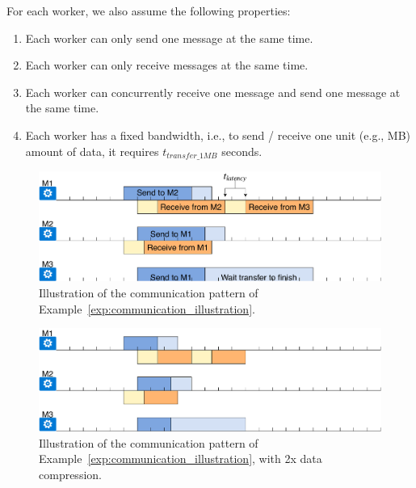 For each worker, we also assume the following properties:
\begin{enumerate}
\item Each worker can only send one message 
at the same time.
\item Each worker can only receive messages 
at the same time.
\item Each worker can concurrently receive one 
message and send one message at the same time.
\item Each worker has a fixed bandwidth, i.e.,
to send / receive one unit (e.g., MB) amount of data,
it requires $t_{transfer\_1MB}$ seconds.
\end{enumerate}

\begin{figure}[t!]
\centering
\includegraphics[width=1.0\textwidth]{figures/Chpt1.3/Communication_Illustration.pdf}
\caption{Illustration of the communication pattern of Example~\ref{exp:communication_illustration}.}
\label{fig:communication_illustration}
\end{figure}

\begin{figure}[t!]
\centering
\includegraphics[width=1.0\textwidth]{figures/Chpt1.3/Communication_Illustration_lowPrecision.pdf}
\caption{Illustration of the communication pattern of Example~\ref{exp:communication_illustration}, with 2x data compression.}
\label{fig:communication_illustration_lowprecision}
\end{figure}

